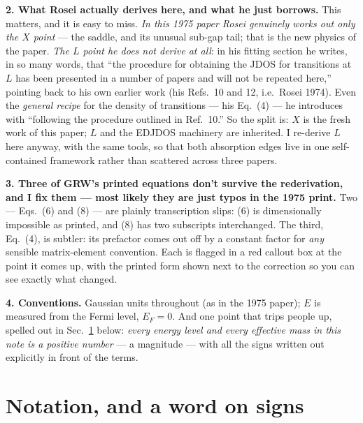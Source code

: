 \documentclass[11pt,a4paper]{article}
\numberwithin{equation}{section}
\begin{document}
\medskip
\noindent\textbf{2. What Rosei actually derives here, and what he
just borrows.} This matters, and it is easy to miss.
\emph{In this 1975 paper Rosei genuinely works out only the $X$
point} --- the saddle, and its unusual sub-gap tail; that is the new
physics of the paper. \emph{The $L$ point he does not derive at all}:
in his fitting section he writes, in so many words, that ``the
procedure for obtaining the JDOS for transitions at $L$ has been
presented in a number of papers and will not be repeated here,''
pointing back to his own earlier work (his Refs.~10 and 12, i.e.\
Rosei 1974). Even the \emph{general recipe} for the density of
transitions --- his Eq.~(4) --- he introduces with ``following the
procedure outlined in Ref.~10.'' So the split is: $X$ is the fresh
work of this paper; $L$ and the EDJDOS machinery are inherited.
I re-derive $L$ here anyway, with the same tools, so that both
absorption edges live in one self-contained framework rather than
scattered across three papers.

\medskip
\noindent\textbf{3. Three of GRW's printed equations don't survive the
rederivation, and I fix them --- most likely they are just typos in
the 1975 print.} Two --- Eqs.~(6) and (8) --- are plainly transcription
slips: (6) is dimensionally impossible as printed, and (8) has two
subscripts interchanged. The third, Eq.~(4), is subtler: its prefactor
comes out off by a constant factor for \emph{any} sensible
matrix-element convention. Each is flagged in a
\textcolor{BrickRed}{red callout box} at the point it comes up, with
the printed form shown next to the correction so you can see exactly
what changed.

\medskip
\noindent\textbf{4. Conventions.} Gaussian units throughout (as in the
1975 paper); $E$ is measured from the Fermi level, $E_F=0$. And one
point that trips people up, spelled out in Sec.~\ref{sec:notation}
below: \emph{every energy level and every effective mass in this note
is a positive number} --- a magnitude --- with all the signs written
out explicitly in front of the terms.

\tableofcontents

\section{Notation, and a word on signs}\label{sec:notation}
\end{document}
